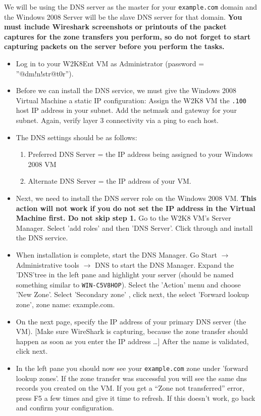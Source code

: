 \documentclass{article}
\begin{document}
We will be using the \ubuntu DNS server as the master for your {\tt example.com} domain and the Windows 2008 Server will be the slave DNS server for that domain. \textbf{You must include Wireshark screenshots or printouts of the packet captures for the zone transfers you perform, so do not forget to start capturing packets on the \ubuntu server before you perform the tasks.}
\begin{itemize}
\item Log in to your W2K8Ent VM as Administrator (password = ''@dm!n!str@t0r'').
\item Before we can install the DNS service, we must give the Windows 2008 Virtual Machine a static IP configuration: 
Assign the W2K8 VM the {\tt .100} host IP address in your subnet. Add the netmask and gateway for your subnet. Again, verify layer 3 connectivity via a ping to each \ubuntu host. 
\item The DNS settings should be as follows:
\begin{enumerate}
\item Preferred DNS Server = the IP address being assigned to your Windows 2008 VM
\item Alternate DNS Server = the IP address of your \ubuntu VM.
\end{enumerate}
\item Next, we need to install the DNS server role on the Windows 2008 VM. \textbf{This action will not work if you do not set the IP address in the Virtual Machine first. Do not skip step 1.} Go to the W2K8 VM's Server Manager. Select 'add roles' and then 'DNS Server'. Click through and install the DNS service. 
\item When installation is complete, start the DNS Manager. Go Start $\rightarrow$ Administrative tools $\rightarrow$ DNS   to start the DNS Manager. Expand the 'DNS'tree in the left pane and highlight your server (should be named something similar to {\tt WIN-C5V8HOP}).  Select the 'Action' menu and choose 'New Zone'. Select 'Secondary zone' , click next, the select 'Forward lookup zone', zone name: example.com.  
\item On the next page, specify the IP address of your primary DNS server (the \ubuntu VM). [Make sure WireShark is capturing, because the zone transfer should happen as soon as you enter the IP address \ldots] After the name is validated, click next.   
\item In the left pane you should now see your {\tt example.com} zone under 'forward lookup zones'.  If the zone transfer was successful you will see the same dns records you created on the \ubuntu VM.  If you get a ``Zone not transferred'' error, press F5 a few times and give it time to refresh.  If this doesn't work, go back and confirm your \ubuntu configuration.

\end{itemize}
\end{document}
